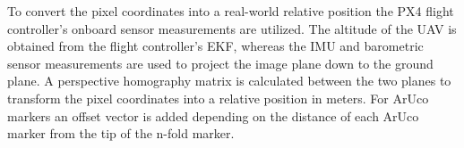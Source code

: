 \documentclass[conference]{IEEEtran}
\begin{document}
To convert the pixel coordinates into a real-world relative position
the PX4 flight controller's onboard sensor measurements are utilized.
The altitude of the UAV is obtained from the flight controller's EKF,
whereas the IMU and barometric sensor measurements are used to project
the image plane down to the ground plane. A perspective homography
matrix is calculated between the two planes to transform the
pixel coordinates into a relative position in meters. For ArUco
markers an offset vector is added depending on the distance of
each ArUco marker from the tip of the n-fold marker.

%
%
%
%
%
%
\end{document}
